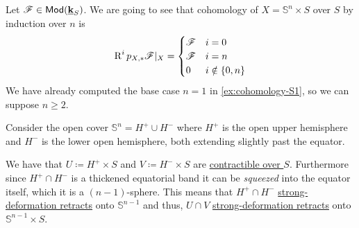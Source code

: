 \documentclass[../../main]{subfiles}
\begin{document}
\begin{example}[\(\mathbb{S}^{n}\)]\label{ex:cohomology-Sn}
  Let \(\mathscr{F} \in \mathsf{Mod}(\underline{\mathbf{k}}_{S})\).
  We are going to see that cohomology of \(X = \mathbb{S}^{n} \times S\) over \(S\) by induction over \(n\) is
  \begin{equation*}
    \operatorname{R}^{i}p_{X, \ast}\mathscr{F}|_{X} = \begin{cases}
      \mathscr{F} & i = 0 \\
      \mathscr{F} & i = n \\
      0 & i \notin \{0, n\}
    \end{cases}
  \end{equation*}
  We have already computed the base case \(n = 1\) in \autoref{ex:cohomology-S1}, so we can suppose \(n \geq 2\).
  
  Consider the open cover \(\mathbb{S}^{n} = H^{+} \cup H^{-}\) where \(H^{+}\) is the open upper hemisphere and \(H^{-}\) is the lower open hemisphere, both extending slightly past the equator.
    
    
    
    
  
  We have that \(U \coloneq H^{+} \times S\) and \(V \coloneq H^{-} \times S\) are \hyperref[def:homotopy-over]{contractible over \(S\)}.
  Furthermore since \(H^{+} \cap H^{-}\) is a thickened equatorial band it can be \textit{squeezed} into the equator itself, which it is a \((n-1)\)-sphere.
  This means that \(H^{+} \cap H^{-}\) \hyperref[def:deformation-retract]{strong-deformation retracts} onto \(\mathbb{S}^{n-1}\) and thus, \(U \cap V\) \hyperref[def:deformation-retract]{strong-deformation retracts} onto \(\mathbb{S}^{n-1} \times S\).


\end{example}
\end{document}
